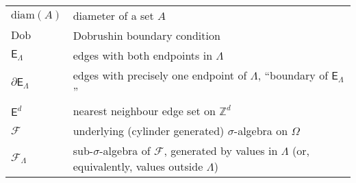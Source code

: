 \documentclass[12pt]{article}
\newcommand{\E}{\mathsf{E}}
\newcommand{\F}{\mathcal{F}}
\newcommand{\Z}{\mathbb{Z}}
\newcommand{\1}{\mathbbm{1}}
\newcommand{\5}{\vspace{0.5cm}}
\theoremstyle{definition}
\begin{document}
\begin{tabular}{p{4cm}p{10cm}}
$\mathrm{diam}(A)$ & diameter of a set $A$ \\
$\mathrm{Dob}$ & Dobrushin boundary condition \\
$\E_\Lambda$ & edges with both endpoints in $\Lambda$ \\
$\partial\E_\Lambda$ & edges with precisely one endpoint of $\Lambda$, ``boundary of $\E_\Lambda$'' \\
$\E^d$ & nearest neighbour edge set on $\Z^d$ \\
$\F$ & underlying (cylinder generated) $\sigma$-algebra on $\Omega$ \\
$\F_\Lambda$ & sub-$\sigma$-algebra of $\F$, generated by values in $\Lambda$ (or, equivalently, values outside $\Lambda$)  
\end{tabular} 

\pagebreak
\end{document}
